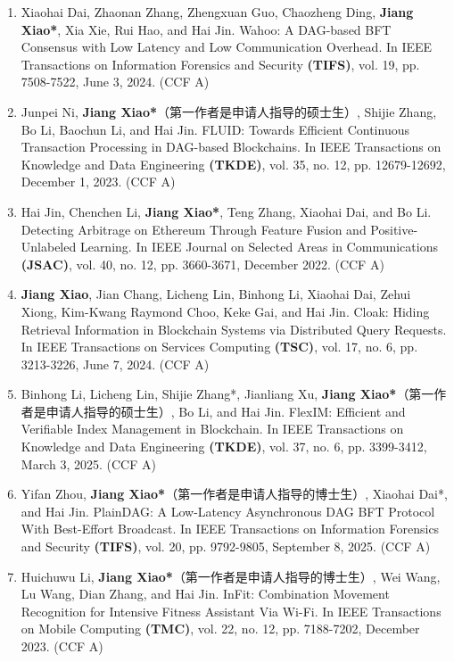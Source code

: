 {\begin{enumerate}[itemsep=0pt, topsep=0pt, parsep=0pt]
    \item Xiaohai Dai, Zhaonan Zhang, Zhengxuan Guo, Chaozheng Ding, \textbf{Jiang Xiao*}, Xia Xie, Rui Hao, and Hai Jin. Wahoo: A DAG-based BFT Consensus with Low Latency and Low Communication Overhead. In IEEE Transactions on Information Forensics and Security \textbf{(TIFS)}, vol. 19, pp. 7508-7522, June 3, 2024. (CCF A)

    \item Junpei Ni, \textbf{Jiang Xiao*}（第一作者是申请人指导的硕士生）, Shijie Zhang, Bo Li, Baochun Li, and Hai Jin. FLUID: Towards Efficient Continuous Transaction Processing in DAG-based Blockchains. In IEEE Transactions on Knowledge and Data Engineering \textbf{(TKDE)}, vol. 35, no. 12, pp. 12679-12692, December 1, 2023. (CCF A)

    \item Hai Jin, Chenchen Li, \textbf{Jiang Xiao*}, Teng Zhang, Xiaohai Dai, and Bo Li. Detecting Arbitrage on Ethereum Through Feature Fusion and Positive-Unlabeled Learning. In IEEE Journal on Selected Areas in Communications \textbf{(JSAC)}, vol. 40, no. 12, pp. 3660-3671, December 2022. (CCF A)

    \item \textbf{Jiang Xiao}, Jian Chang, Licheng Lin, Binhong Li, Xiaohai Dai, Zehui Xiong, Kim-Kwang Raymond Choo, Keke Gai, and Hai Jin. Cloak: Hiding Retrieval Information in Blockchain Systems via Distributed Query Requests. In IEEE Transactions on Services Computing \textbf{(TSC)}, vol. 17, no. 6, pp. 3213-3226, June 7, 2024. (CCF A)

    \item Binhong Li, Licheng Lin, Shijie Zhang*, Jianliang Xu, \textbf{Jiang Xiao*}（第一作者是申请人指导的硕士生）, Bo Li, and Hai Jin. FlexIM: Efficient and Verifiable Index Management in Blockchain. In IEEE Transactions on Knowledge and Data Engineering \textbf{(TKDE)}, vol. 37, no. 6, pp. 3399-3412, March 3, 2025. (CCF A)

    \item Yifan Zhou, \textbf{Jiang Xiao*}（第一作者是申请人指导的博士生）, Xiaohai Dai*, and Hai Jin. PlainDAG: A Low-Latency Asynchronous DAG BFT Protocol With Best-Effort Broadcast. In IEEE Transactions on Information Forensics and Security \textbf{(TIFS)}, vol. 20, pp. 9792-9805, September 8, 2025. (CCF A)

    \item Huichuwu Li, \textbf{Jiang Xiao*}（第一作者是申请人指导的博士生）, Wei Wang, Lu Wang, Dian Zhang, and Hai Jin. InFit: Combination Movement Recognition for Intensive Fitness Assistant Via Wi-Fi. In IEEE Transactions on Mobile Computing \textbf{(TMC)}, vol. 22, no. 12, pp. 7188-7202, December 2023. (CCF A)


\end{enumerate}}
